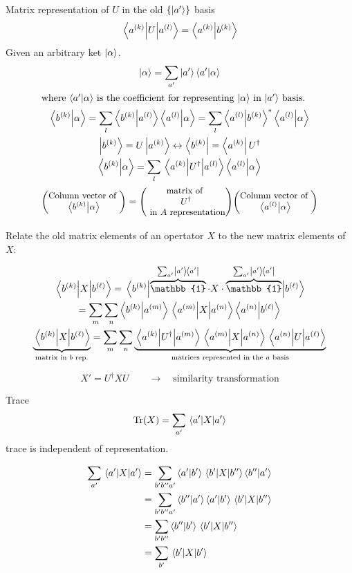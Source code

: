 \begin{frame}{Matrix representation of $U$ in the old $\{\ket{a'}\}$ basis}
	\[
		\mel{a^{(k)}}{U}{a^{(l)}} = \ip{a^{(k)}}{b^{(k)}}
	\]
	Given an arbitrary ket $\ket{\alpha}$.
	\begin{gather*}
		\ket{\alpha} = \sum_{a'} \ket{a'} \bra{a'}\ket{\alpha}\\
		\intertext{where $\ip{a'}{\alpha}$ is the coefficient for representing $\ket{\alpha}$ in $\ket{a'}$ basis.}
		\ip{b^{(k)}}{\alpha} = \sum_l \ip{b^{(k)}}{a^{(l)}} \ip{a^{(l)}}{\alpha} = \sum_l \ip{a^{(l)}}{b^{(k)}}^* \ip{a^{(l)}}{\alpha}\\
		\ket{b^{(k)}} = U \ket{a^{(k)}} \leftrightarrow \bra{b^{(k)}} = \bra{a^{(k)}}U^\dag\\
		\ip{b^{(k)}}{\alpha} = \sum_l \mel{a^{(k)}}{U^\dag}{a^{(l)}}\ip{a^{(l)}}{\alpha}\\
		\small\mqty(\text{Column vector of }\\ \ip{b^{(k)}}{\alpha}) = \mqty(\text{matrix of } \\ U^\dag \\ \text{ in } A \text{ representation}) \mqty(\text{Column vector of }\\ \ip{a^{(l)}}{\alpha})
	\end{gather*}
\end{frame}

\begin{frame}
	Relate the old matrix elements of an opertator $X$ to the new matrix elements of $X$:

	\begin{gather*}
		\mel{b^{(k)}}{X}{b^{(\ell)}} = \mel{b^{(k)}}{\overbrace{\mathbb{1}}^{\sum_{a'} \op{a'}} \cdot X \cdot \overbrace{\mathbb{1}}^{\sum_{a'} \op{a'}}}{b^{(\ell)}}\\
		= \sum_m \sum_n \ip{b^{(k)}}{a^{(m)}}\mel{a^{(m)}}{X}{a^{(n)}} \ip{a^{(n)}}{b^{(\ell)}}\\
		\underbrace{\mel{b^{(k)}}{X}{b^{(\ell)}}}_{\text{matrix in $b$ rep.}} = \sum_m \sum_n \underbrace{\mel{a^{(k)}}{U^\dag}{a^{(m)}} \mel{a^{(m)}}{X}{a^{(n)}} \mel{a^{(n)}}{U}{a^{(\ell)}}}_{\text{matrices represented in the $a$ basis}}
	\end{gather*}

	$$ X' = U^\dag X U \qquad{\to} \quad \text{similarity transformation}$$
\end{frame}

\begin{frame}{Trace}
	\[\Tr(X) = \sum_{a'} \mel{a'}{X }{a'}\] trace is independent of representation.

	\begin{align*}
		\sum_{a'} \mel{a'}{X }{a'} & = \sum_{b' b'' a'} \ip{a'}{b'} \mel{b'}{X}{b''} \ip{b''}{a'} \\
		                           & = \sum_{b' b'' a'} \ip{b''}{a'} \ip{a'}{b'} \mel{b'}{X}{b''} \\
		                           & = \sum_{b' b''} \ip{b''}{b'} \mel{b'}{X}{b''}                \\
		                           & = \sum_{b'} \ev{X}{b'}
	\end{align*}
\end{frame}

